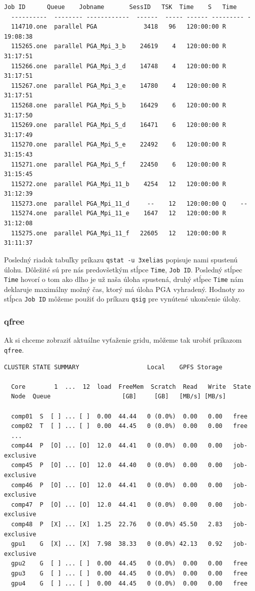 \begin{lstlisting}[caption={qstat -u 3xelias}]
  Job ID      Queue    Jobname       SessID   TSK  Time    S   Time
  ----------  -------- ------------  ------  ----- ------ --------- - 
  114710.one  parallel PGA             3418   96   120:00:00 R 19:08:38
  115265.one  parallel PGA_Mpi_3_b    24619    4   120:00:00 R 31:17:51
  115266.one  parallel PGA_Mpi_3_d    14748    4   120:00:00 R 31:17:51
  115267.one  parallel PGA_Mpi_3_e    14780    4   120:00:00 R 31:17:51
  115268.one  parallel PGA_Mpi_5_b    16429    6   120:00:00 R 31:17:50
  115269.one  parallel PGA_Mpi_5_d    16471    6   120:00:00 R 31:17:49
  115270.one  parallel PGA_Mpi_5_e    22492    6   120:00:00 R 31:15:43
  115271.one  parallel PGA_Mpi_5_f    22450    6   120:00:00 R 31:15:45
  115272.one  parallel PGA_Mpi_11_b    4254   12   120:00:00 R 31:12:39
  115273.one  parallel PGA_Mpi_11_d     --    12   120:00:00 Q    -- 
  115274.one  parallel PGA_Mpi_11_e    1647   12   120:00:00 R 31:12:08
  115275.one  parallel PGA_Mpi_11_f   22605   12   120:00:00 R 31:11:37
\end{lstlisting}

Posledný riadok tabuľky príkazu \texttt{qstat -u 3xelias} popisuje nami spustenú úlohu.
Dôležité sú pre nás predovšetkým stĺpce \texttt{Time}, \texttt{Job ID}.
Posledný stĺpec \texttt{Time} hovorí o tom ako dlho je už naša úloha spustená, druhý stĺpec \texttt{Time} nám deklaruje maximálny možný čas,
ktorý má úloha PGA vyhradený. Hodnoty zo stĺpca \texttt{Job ID} môžeme použiť do príkazu \texttt{qsig} pre vynútené ukončenie úlohy.

\subsubsection{qfree}
Ak si chceme zobraziť aktuálne vyťaženie gridu, môžeme tak urobiť príkazom \texttt{qfree}.

\begin{lstlisting}[caption={qfree}]
  CLUSTER STATE SUMMARY                   Local    GPFS Storage
  
  Core        1  ...  12  load  FreeMem  Scratch  Read   Write  State
  Node  Queue                    [GB]     [GB]   [MB/s] [MB/s]
  
  comp01  S  [ ] ... [ ]  0.00  44.44   0 (0.0%)  0.00   0.00   free
  comp02  T  [ ] ... [ ]  0.00  44.45   0 (0.0%)  0.00   0.00   free
  ...
  comp44  P  [O] ... [O]  12.0  44.41   0 (0.0%)  0.00   0.00   job-exclusive
  comp45  P  [O] ... [O]  12.0  44.40   0 (0.0%)  0.00   0.00   job-exclusive
  comp46  P  [O] ... [O]  12.0  44.41   0 (0.0%)  0.00   0.00   job-exclusive
  comp47  P  [O] ... [O]  12.0  44.41   0 (0.0%)  0.00   0.00   job-exclusive
  comp48  P  [X] ... [X]  1.25  22.76   0 (0.0%) 45.50   2.83   job-exclusive
  gpu1    G  [X] ... [X]  7.98  38.33   0 (0.0%) 42.13   0.92   job-exclusive
  gpu2    G  [ ] ... [ ]  0.00  44.45   0 (0.0%)  0.00   0.00   free
  gpu3    G  [ ] ... [ ]  0.00  44.45   0 (0.0%)  0.00   0.00   free
  gpu4    G  [ ] ... [ ]  0.00  44.45   0 (0.0%)  0.00   0.00   free
\end{lstlisting}

